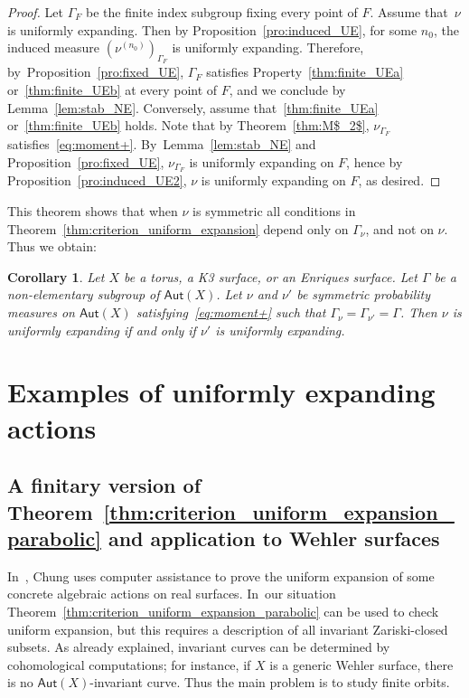 \documentclass[11pt]{article}
\newcommand{\Subsection}{\subsection}
\newcommand\Aut{\mathsf{Aut}}
\theoremstyle{plain}
\newtheorem{cor}[thm]{Corollary}
\theoremstyle{definition}
\numberwithin{equation}{section}
\begin{document}
\begin{proof}
Let $\Gamma_F$ be the finite index subgroup fixing every point of $F$.
Assume that~$\nu$ is uniformly expanding. Then by Proposition~\ref{pro:induced_UE}, for some
$n_0$, the induced measure $(\nu^{(n_0)})_{\Gamma_F}$ is uniformly expanding. Therefore, by~Proposition~\ref{pro:fixed_UE}, $\Gamma_F$ satisfies Property~\eqref{thm:finite_UEa} or~\eqref{thm:finite_UEb} at every point of $F$, and
we conclude by Lemma~\ref{lem:stab_NE}.
Conversely, assume that~\eqref{thm:finite_UEa} or~\eqref{thm:finite_UEb} holds. Note that by Theorem~\ref{thm:M$_2$},
$\nu_{\Gamma_F}$ satisfies~\eqref{eq:moment+}. By~Lemma~\ref{lem:stab_NE} and Proposition~\ref{pro:fixed_UE},
$\nu_{\Gamma_F}$ is uniformly expanding on $F$,
hence by Proposition~\ref{pro:induced_UE2}, $\nu$ is uniformly expanding on $F$, as desired.
\end{proof}

This theorem shows that when $\nu$ is symmetric
all conditions in Theorem~\ref{thm:criterion_uniform_expansion} depend only on
$\Gamma_\nu$, and not on $\nu$. Thus we obtain:

\begin{cor}\label{cor:independence_nu}
Let $X$ be a torus, a K3 surface, or an Enriques surface. Let $\Gamma$ be a non-elementary subgroup of $\Aut(X)$. Let $\nu$ and $\nu'$ be symmetric probability measures
on $\Aut(X)$ satisfying~\eqref{eq:moment+} such that $\Gamma_\nu = \Gamma_{\nu'}=\Gamma$. Then $\nu$ is uniformly expanding if and only if $\nu'$ is
uniformly expanding.
\end{cor}

\section{Examples of uniformly expanding actions}

\Subsection{A finitary version of Theorem~\ref{thm:criterion_uniform_expansion_parabolic} and application to Wehler surfaces}\label{subs:finitary}

In~\cite[\S\S 7-8]{chung}, Chung uses computer assistance to prove the uniform expansion of
some concrete algebraic actions on real surfaces. In~our situation
Theorem~\ref{thm:criterion_uniform_expansion_parabolic} can be used to
check uniform expansion, but this requires a description of all invariant Zariski-closed subsets.
As already explained, invariant curves can be determined by cohomological computations; for instance, if $X$ is a generic Wehler surface, there is no $\Aut(X)$-invariant curve. Thus the main problem is to study finite orbits.
\end{document}
